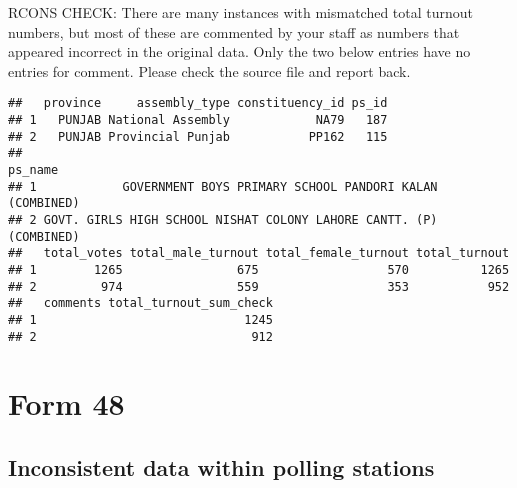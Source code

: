\documentclass[]{article}
\newenvironment{Shaded}{\begin{snugshade}}{\end{snugshade}}
\newcommand{\DataTypeTok}[1]{\textcolor[rgb]{0.13,0.29,0.53}{#1}}
\newcommand{\DecValTok}[1]{\textcolor[rgb]{0.00,0.00,0.81}{#1}}
\newcommand{\KeywordTok}[1]{\textcolor[rgb]{0.13,0.29,0.53}{\textbf{#1}}}
\newcommand{\NormalTok}[1]{#1}
\newcommand{\OperatorTok}[1]{\textcolor[rgb]{0.81,0.36,0.00}{\textbf{#1}}}
\newcommand{\OtherTok}[1]{\textcolor[rgb]{0.56,0.35,0.01}{#1}}
\newcommand{\StringTok}[1]{\textcolor[rgb]{0.31,0.60,0.02}{#1}}
\begin{document}
RCONS CHECK: There are many instances with mismatched total turnout
numbers, but most of these are commented by your staff as numbers that
appeared incorrect in the original data. Only the two below entries have
no entries for comment. Please check the source file and report back.

\begin{Shaded}
\end{Shaded}

\begin{verbatim}
##   province     assembly_type constituency_id ps_id
## 1   PUNJAB National Assembly            NA79   187
## 2   PUNJAB Provincial Punjab           PP162   115
##                                                              ps_name
## 1            GOVERNMENT BOYS PRIMARY SCHOOL PANDORI KALAN (COMBINED)
## 2 GOVT. GIRLS HIGH SCHOOL NISHAT COLONY LAHORE CANTT. (P) (COMBINED)
##   total_votes total_male_turnout total_female_turnout total_turnout
## 1        1265                675                  570          1265
## 2         974                559                  353           952
##   comments total_turnout_sum_check
## 1                             1245
## 2                              912
\end{verbatim}

\hypertarget{form-48}{%
\section{Form 48}\label{form-48}}

\hypertarget{inconsistent-data-within-polling-stations}{%
\subsection{Inconsistent data within polling
stations}\label{inconsistent-data-within-polling-stations}}
\end{document}

